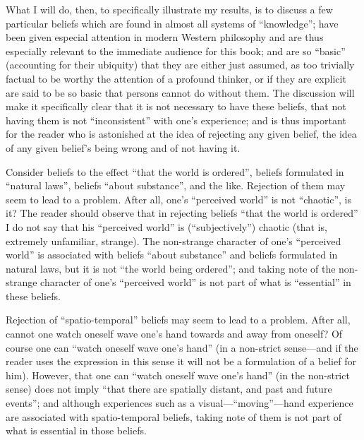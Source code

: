 What I will do, then, to specifically illustrate my results, is to discuss a 
few particular beliefs which are found in almost all systems of \enquote{knowledge}; 
have been given especial attention in modern Western philosophy and are 
thus especially relevant to the immediate audience for this book; and are so 
\enquote{basic} (accounting for their ubiquity) that they are either just assumed, as 
too trivially factual to be worthy the attention of a profound thinker, or if 
they are explicit are said to be so basic that persons cannot do without them. 
The discussion will make it specifically clear that it is not necessary to have 
these beliefs, that not having them is not \enquote{inconsistent} with one's 
experience; and is thus important for the reader who is astonished at the idea 
of rejecting any given belief, the idea of any given belief's being wrong and 
of not having it. 

Consider beliefs to the effect \enquote{that the world is ordered}, beliefs 
formulated in \enquote{natural laws}, beliefs \enquote{about substance}, and the like. 
Rejection of them may seem to lead to a problem. After all, one's \enquote{perceived 
world} is not \enquote{chaotic}, is it? The reader should observe that in rejecting 
beliefs \enquote{that the world is ordered} I do not say that his \enquote{perceived world} is 
(\enquote{subjectively}) chaotic (that is, extremely unfamiliar, strange). The 
non-strange character of one's \enquote{perceived world} is associated with beliefs 
\enquote{about substance} and beliefs formulated in natural laws, but it is not \enquote{the 
world being ordered}; and taking note of the non-strange character of one's 
\enquote{perceived world} is not part of what is \enquote{essential} in these beliefs. 

Rejection of \enquote{spatio-temporal} beliefs may seem to lead to a problem. 
After all, cannot one watch oneself wave one's hand towards and away from 
oneself? Of course one can \enquote{watch oneself wave one's hand} (in a non-strict 
sense---and if the reader uses the expression in this sense it will not be a 
formulation of a belief for him). However, that one can \enquote{watch oneself wave 
one's hand} (in the non-strict sense) does not imply \enquote{that there are spatially 
distant, and past and future events}; and although experiences such as a 
visual---\enquote{moving}---hand experience are associated with spatio-temporal 
beliefs, taking note of them is not part of what is essential in those beliefs. 

